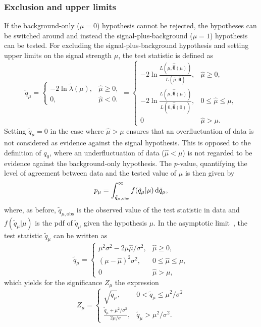 \subsubsection{Exclusion and upper limits}
If the background-only ($\mu = 0$) hypothesis cannot be rejected, the hypotheses can be switched around and instead the signal-plus-background ($\mu = 1$) hypothesis can be tested. For excluding the signal-plus-background hypothesis and setting upper limits on the signal strength $\mu$, the test statistic is defined as
\begin{equation}
	\tilde{q}_\mu = 
\begin{cases}
    -2\ln{\tilde{\lambda}(\mu)}, & \hat{\mu} \geq 0,\\
    0,              & \hat{\mu} < 0.
\end{cases} =
\begin{cases}
    -2 \ln{\frac{L(\mu,\boldsymbol{\hat{\hat{\theta}}}(\mu))}{L(\hat{\mu},\hat{\boldsymbol{\theta}})}}, & \hat{\mu} \geq 0,\\
    -2 \ln{\frac{L(\mu,\boldsymbol{\hat{\hat{\theta}}}(\mu))}{L(0,\boldsymbol{\hat{\hat{\theta}}}(0))}},              & 0 \leq \hat{\mu} \leq \mu, \\
    0  & \hat{\mu} > \mu.
\end{cases}
\end{equation}
Setting $\tilde{q}_\mu = 0$ in the case where $\hat{\mu} > \mu$ ensures that an overfluctuation of data is not considered as evidence against the signal hypothesis. This is opposed to the definition of $q_0$, where an underfluctuation of data ($\hat{\mu} < \mu$) is not regarded to be evidence against the background-only hypothesis. The $p$-value, quantifying the level of agreement between data and the tested value of $\mu$ is then given by
\begin{equation}
		p_\mu = \int_{\tilde{q}_{\mu,\mathrm{obs}}}^{\infty}{f(\tilde{q}_\mu\vert \mu)\mathop{}\!\mathrm{d} \tilde{q}_\mu},
\end{equation}
where, as before, $\tilde{q}_{\mu,\mathrm{obs}}$ is the observed value of the test statistic in data and $f(\tilde{q}_\mu\vert \mu)$ is the \gls{pdf} of $\tilde{q}_\mu$ given the hypothesis $\mu$. In the asymptotic limit~\cite{Cowan:2010js}, the test statistic $\tilde{q}_\mu$ can be written as
\begin{equation}
	\tilde{q}_\mu = 
\begin{cases}
    \mu^2\sigma^2 - 2\mu\hat{\mu}/\sigma^2, & \hat{\mu} \geq 0,\\
    (\mu-\hat{\mu})^2\sigma^2,              & 0 \leq \hat{\mu} \leq \mu, \\
    0  & \hat{\mu} > \mu,
\end{cases}
\end{equation}
which yields for the significance $Z_\mu$ the expression
\begin{equation}
	Z_\mu = 
\begin{cases}
    \sqrt{\tilde{q}_\mu}, & 0 < \tilde{q}_\mu \leq \mu^2/\sigma^2 \\
    \frac{\tilde{q}_\mu + \mu^2/\sigma^2}{2\mu/\sigma},              & \tilde{q}_\mu > \mu^2/\sigma^2 .
\end{cases}
\end{equation}


